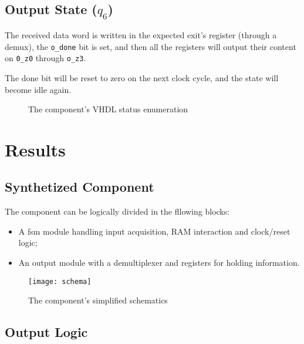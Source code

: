 \documentclass[12pt,a4paper]{article}
\newcommand{\code}{\texttt}
\begin{document}
	\subsection{Output State ($q_6$)}
	
	The received data word is written in the expected exit's register (through a demux), the \code{o\_done} bit is set, and then all the registers will output their content on \code{0\_z0} through \code{o\_z3}.

	The done bit will be reset to zero on the next clock cycle, and the state will become idle again.


 \vspace{1cm}
	

        \begin{figure}[H]
	       \centering
	       
	       \caption{The component's VHDL status enumeration}
        \end{figure}




\newpage

    \section{Results}
        \subsection{Synthetized Component}

        The component can be logically divided in the fllowing blocks:

	\begin{itemize}
			\item A fsm module handling input acquisition, RAM interaction and clock/reset logic;
			\item An output module with a demultiplexer and registers for holding information.
	\end{itemize}

        \begin{figure}[H]
        	\centering
        	\texttt{[image: schema]}
        	\caption{The component's simplified schematics}
        	\label{fig:schema}
        \end{figure}



        \subsection{Output Logic}
 
\end{document}
